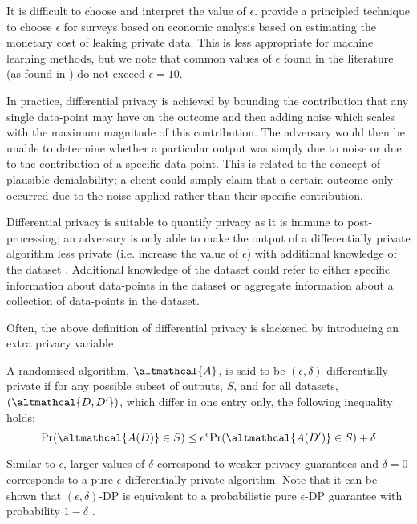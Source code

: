 It is difficult to choose and interpret the value of $\epsilon$. \cite{hsu2014differential} provide a principled technique to choose $\epsilon$ for surveys based on economic analysis based on estimating the monetary cost of leaking private data. This is less appropriate for machine learning methods, but we note that common values of $\epsilon$ found in the literature (as found in \citet{hsu2014differential}) do not exceed $\epsilon = 10$.

In practice, differential privacy is achieved by bounding the contribution that any single data-point may have on the outcome and then adding noise which scales with the maximum magnitude of this contribution. The adversary would then be unable to determine whether a particular output was simply due to noise or due to the contribution of a specific data-point. This is related to the concept of plausible denialability; a client could simply claim that a certain outcome only occurred due to the noise applied rather than their specific contribution.

Differential privacy is suitable to quantify privacy as it is immune to post-processing; an adversary is only able to make the output of a differentially private algorithm less private (i.e. increase the value of $\epsilon$) with additional knowledge of the dataset \citep{foundations}. Additional knowledge of the dataset could refer to either specific information about data-points in the dataset or aggregate information about a collection of data-points in the dataset. 

Often, the above definition of differential privacy is slackened by introducing an extra privacy variable. 

\begin{definition}
	\label{def:epdp}
	 A randomised algorithm, $\altmathcal{A}$, is said to be $(\epsilon, \delta)$ differentially private if for any possible subset of outputs, $S$, and for all datasets, $(\altmathcal{D, D'})$, which differ in one entry only, the following inequality holds:
	\begin{equation}
	\text{Pr}(\altmathcal{A(D)} \in S) \leq e^\epsilon \text{Pr}(\altmathcal{A(D')} \in S) + \delta
	\end{equation}
\end{definition}
Similar to $\epsilon$, larger values of $\delta$ correspond to weaker privacy guarantees and $\delta=0$ corresponds to a pure $\epsilon$-differentially private algorithm. Note that it can be shown that $(\epsilon, \delta)$-DP is equivalent to a probabilistic pure $\epsilon$-DP guarantee with probability $1-\delta$  \citep{foundations}.

